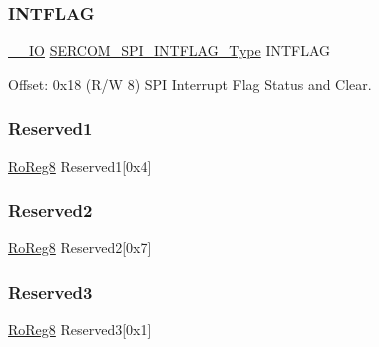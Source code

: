 \mbox{\label{struct_sercom_spi_ab17ab7d83f3569498cf87a144aa6188b}} 
\subsubsection{\texorpdfstring{INTFLAG}{INTFLAG}}
{\footnotesize\ttfamily \mbox{\hyperlink{core__cm0plus_8h_aec43007d9998a0a0e01faede4133d6be}{\+\_\+\+\_\+\+IO}} \mbox{\hyperlink{union_s_e_r_c_o_m___s_p_i___i_n_t_f_l_a_g___type}{S\+E\+R\+C\+O\+M\+\_\+\+S\+P\+I\+\_\+\+I\+N\+T\+F\+L\+A\+G\+\_\+\+Type}} I\+N\+T\+F\+L\+AG}



Offset\+: 0x18 (R/W 8) S\+PI Interrupt Flag Status and Clear. 

\mbox{\label{struct_sercom_spi_a1106a1fe7c5fa01a183c54b4b992a7f0}} 
\subsubsection{\texorpdfstring{Reserved1}{Reserved1}}
{\footnotesize\ttfamily \mbox{\hyperlink{group___s_a_m_d21_e15_a__definitions_ga0d957f1433aaf5d70e4dc2b68288442d}{Ro\+Reg8}} Reserved1\mbox{[}0x4\mbox{]}}

\mbox{\label{struct_sercom_spi_a7cc707677b50fdb014ad80a86239b7e8}} 
\subsubsection{\texorpdfstring{Reserved2}{Reserved2}}
{\footnotesize\ttfamily \mbox{\hyperlink{group___s_a_m_d21_e15_a__definitions_ga0d957f1433aaf5d70e4dc2b68288442d}{Ro\+Reg8}} Reserved2\mbox{[}0x7\mbox{]}}

\mbox{\label{struct_sercom_spi_ae12c3e940f27988a085afebe2f779a21}} 
\subsubsection{\texorpdfstring{Reserved3}{Reserved3}}
{\footnotesize\ttfamily \mbox{\hyperlink{group___s_a_m_d21_e15_a__definitions_ga0d957f1433aaf5d70e4dc2b68288442d}{Ro\+Reg8}} Reserved3\mbox{[}0x1\mbox{]}}


